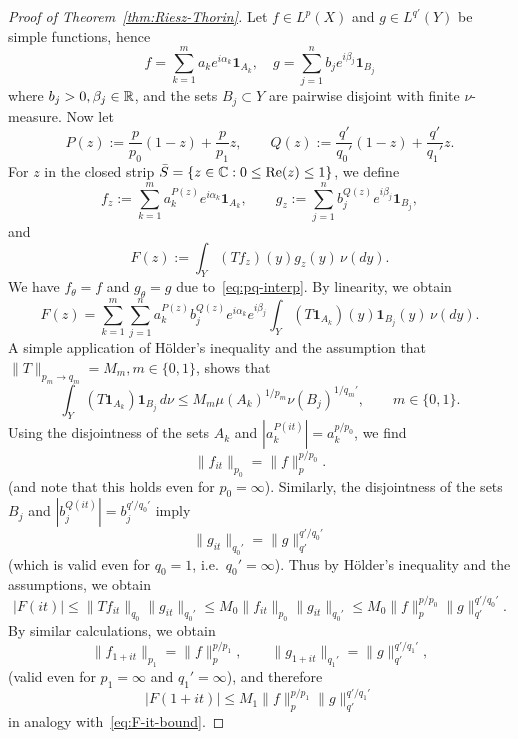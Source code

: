 \begin{proof}[Proof of Theorem~\ref{thm:Riesz-Thorin}]
Let $f\in L^p(X)$ and $g\in L^{q'}(Y)$ be simple functions, hence
\begin{equation*}
    f = \sum_{k=1}^m a_k e^{i\alpha_k} \mathbf{1}_{A_k}, \quad g = \sum_{j=1}^n b_j e^{i\beta_j} \mathbf{1}_{B_j}
\end{equation*}
where $b_j>0, \beta_j\in\mathbb{R}$, and the sets $B_j \subset Y$ are pairwise disjoint with finite $\nu$-measure. Now let
\begin{equation*}
    P(z):=\frac{p}{p_0}(1-z) +\frac{p}{p_1}z, \qquad Q(z):=\frac{q'}{q_0'}(1-z) +\frac{q'}{q_1'}z.
\end{equation*}
For $z$ in the closed strip $\bar{S}=\{z\in\mathbb{C}: 0\le\mathrm{Re}(z)\le 1\}$, we define
\begin{equation*}
    f_z:=\sum_{k=1}^m a_k^{P(z)}e^{i\alpha_k}\mathbf{1}_{A_k}, \qquad g_z:=\sum_{j=1}^n b_j^{Q(z)}e^{i\beta_j}\mathbf{1}_{B_j},
\end{equation*}
and
\begin{equation*}
    F(z):=\int_Y (Tf_z)(y)g_z(y)\,\nu(dy).
\end{equation*}
We have $f_\theta=f$ and $g_\theta=g$ due to~\eqref{eq:pq-interp}. By linearity, we obtain
\begin{equation*}
    F(z)=\sum_{k=1}^m \sum_{j=1}^n a_k^{P(z)}b_j^{Q(z)}e^{i\alpha_k}e^{i\beta_j} \int_Y (T\mathbf{1}_{A_k})(y)\mathbf{1}_{B_j}(y)\,\nu(dy).
\end{equation*}
A simple application of H\"{o}lder's inequality and the assumption that $\|T\|_{p_m\to q_m}=M_m, m\in\{0,1\}$, shows that
\begin{equation*}
    \int_Y (T\mathbf{1}_{A_k}) \mathbf{1}_{B_j} \,d\nu \le M_m \mu(A_k)^{1/p_m}\nu(B_j)^{1/q_m'}, \qquad m\in\{0,1\}.
\end{equation*}
Using the disjointness of the sets $A_k$ and $|a_k^{P(it)}|=a_k^{p/p_0}$, we find
\begin{equation*}
    \|f_{it}\|_{p_0} = \|f\|_{p}^{p/p_0}.
\end{equation*}
(and note that this holds even for $p_0=\infty$). Similarly, the disjointness of the sets $B_j$ and $|b_j^{Q(it)}|=b_j^{q'/q_0'}$ imply
\begin{equation*}
    \|g_{it}\|_{q_0'} = \|g\|_{q'}^{q'/q_0'}
\end{equation*}
(which is valid even for $q_0=1$, i.e.\ $q_0'=\infty$). Thus by H\"{o}lder's inequality and the assumptions, we obtain
\begin{equation}
\label{eq:F-it-bound}
    |F(it)|\le \|Tf_{it}\|_{q_0}\|g_{it}\|_{q_0'}\le M_0\|f_{it}\|_{p_0}\|g_{it}\|_{q_0'}\le M_0\|f\|_p^{p/p_0}\|g\|_{q'}^{q'/q_0'}.
\end{equation}
By similar calculations, we obtain
\begin{equation*}
    \|f_{1+it}\|_{p_1}=\|f\|_p^{p/p_1}, \qquad \|g_{1+it}\|_{q_1'}=\|g\|_{q'}^{q'/q_1'},
\end{equation*}
(valid even for $p_1=\infty$ and $q_1'=\infty$), and therefore
\begin{equation}
\label{eq:F-1+it-bound}
    |F(1+it)|\le M_1\|f\|_p^{p/p_1}\|g\|_{q'}^{q'/q_1'}
\end{equation}
in analogy with~\eqref{eq:F-it-bound}.


\end{proof}
